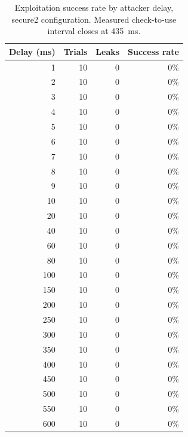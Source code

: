 \begin{table}[ht]
\centering
\begin{tabular}{rrrr}
\hline
Delay (ms) & Trials & Leaks & Success rate \\
\hline
1 & 10 & 0 & 0\% \\
2 & 10 & 0 & 0\% \\
3 & 10 & 0 & 0\% \\
4 & 10 & 0 & 0\% \\
5 & 10 & 0 & 0\% \\
6 & 10 & 0 & 0\% \\
7 & 10 & 0 & 0\% \\
8 & 10 & 0 & 0\% \\
9 & 10 & 0 & 0\% \\
10 & 10 & 0 & 0\% \\
20 & 10 & 0 & 0\% \\
40 & 10 & 0 & 0\% \\
60 & 10 & 0 & 0\% \\
80 & 10 & 0 & 0\% \\
100 & 10 & 0 & 0\% \\
150 & 10 & 0 & 0\% \\
200 & 10 & 0 & 0\% \\
250 & 10 & 0 & 0\% \\
300 & 10 & 0 & 0\% \\
350 & 10 & 0 & 0\% \\
400 & 10 & 0 & 0\% \\
450 & 10 & 0 & 0\% \\
500 & 10 & 0 & 0\% \\
550 & 10 & 0 & 0\% \\
600 & 10 & 0 & 0\% \\
\hline
\end{tabular}
\caption{Exploitation success rate by attacker delay, secure2 configuration. Measured check-to-use interval closes at 435~ms.}
\label{tab:success-secure2}
\end{table}
